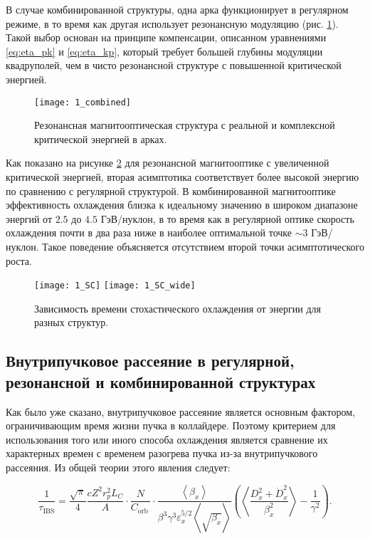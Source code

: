 \noindent В случае комбинированной структуры, одна арка функционирует в регулярном режиме, в то время как другая использует резонансную модуляцию (рис. \ref{fig:1_combined}). Такой выбор основан на принципе компенсации, описанном уравнениями \ref{eq:eta_pk} и \ref{eq:eta_kp}, который требует большей глубины модуляции квадруполей, чем в чисто резонансной структуре с повышенной критической энергией.

\begin{figure}[!h]
  \centering
   \texttt{[image: 1\_combined]}
   \caption{Резонансная магнитооптическая структура с реальной и комплексной критической энергией в арках.}
   \label{fig:1_combined}
\end{figure}

\noindent Как показано на рисунке \ref{fig:1_SC} для резонансной магнитооптике с увеличенной критической энергией, вторая асимптотика соответствует более высокой энергию по сравнению с регулярной структурой. В комбинированной магнитооптике эффективность охлаждения близка к идеальному значению в широком диапазоне энергий от $2.5$ до $4.5$ ГэВ/нуклон, в то время как в регулярной оптике скорость охлаждения почти в два раза ниже в наиболее оптимальной точке $\sim3$ ГэВ/нуклон. Такое поведение объясняется отсутствием второй точки асимптотического роста.

\begin{figure}[!h]
  \centering
   \texttt{[image: 1\_SC]}
   \texttt{[image: 1\_SC\_wide]}
   \caption{Зависимость времени стохастического охлаждения от энергии для разных структур.}
   \label{fig:1_SC}
\end{figure}

\newpage
\subsection{Внутрипучковое рассеяние в регулярной, резонансной и комбинированной структурах}\label{sec:ions_light/IBS_res_reg}

\par Как было уже сказано, внутрипучковое рассеяние является основным фактором, ограничивающим время жизни пучка в коллайдере. Поэтому критерием для использования того или иного способа охлаждения является сравнение их характерных времен с временем разогрева пучка из-за внутрипучкового рассеяния. Из общей теории этого явления следует:

\begin{equation}
\frac{1}{\tau_{\textrm{IBS}}}=\frac{\sqrt\pi}{4}\frac{cZ^2r_p^2L_C}{A}\cdot\frac{N}{C_{\mathrm{orb\ }}}\cdot\frac{\left\langle\beta_x\right\rangle}{\beta^3\gamma^3\varepsilon_x^{5/2}\left\langle\sqrt{\beta_x}\right\rangle}\left(\left\langle\frac{D_x^2+{\dot{D}}_x^2}{\beta_x^2}\right\rangle-\frac{1}{\gamma^2}\right).
\label{eq:IBS}
\end{equation}

